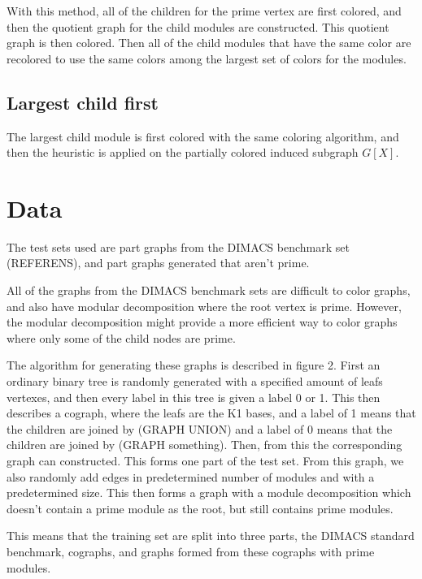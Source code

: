 \documentclass{amsart}
\begin{document}
With this method, all of the children for the prime vertex are first colored,
and then the quotient graph for the child modules are constructed. This quotient
graph is then colored. Then all of the child modules that have the same color
are recolored to use the same colors among the largest set of colors for the
modules.



\subsection{Largest child first}

The largest child module is first colored with the same coloring algorithm, and
then the heuristic is applied on the partially colored induced subgraph 
$G[X]$.


\section{Data}
\label{sec:Data}

The test sets used are part graphs from the DIMACS benchmark set (REFERENS), 
and part graphs generated that aren't prime.

All of the graphs from the DIMACS benchmark sets are difficult to color graphs,
and also have modular decomposition where the root vertex is prime. However, the
modular decomposition might provide a more efficient way to color graphs where
only some of the child nodes are prime. 

The algorithm for generating these graphs is described in figure 2. First an
ordinary binary tree is randomly generated with a specified amount of leafs
vertexes, and then every label in this tree is given a label 0 or 1.  This then
describes a cograph, where the leafs are the K1 bases, and a label of 1 means
that the children are joined by (GRAPH UNION) and a label of 0 means that the
children are joined by (GRAPH something). Then, from this the corresponding
graph can constructed. This forms one part of the test set. From this graph, we
also randomly add edges in predetermined number of modules and with a
predetermined size. This then forms a graph with a module decomposition which
doesn't contain a prime module as the root, but still contains prime modules.

This means that the training set are split into three parts, the DIMACS standard
benchmark, cographs, and graphs formed from these cographs with prime modules.
\end{document}

